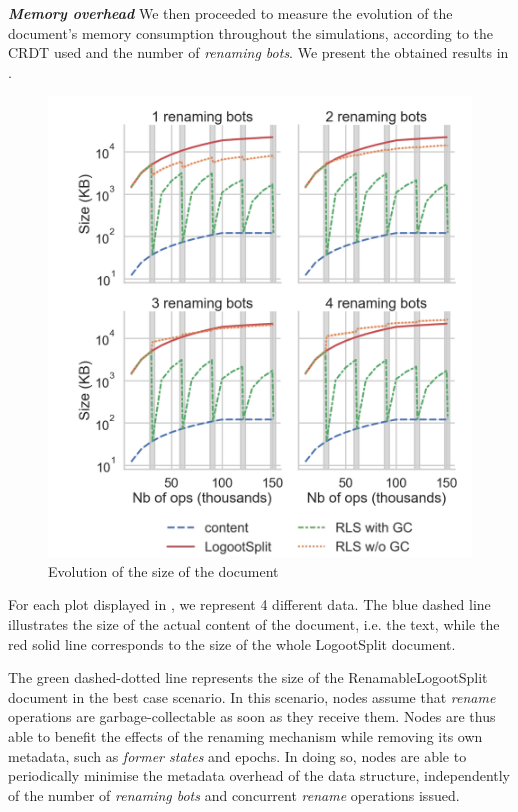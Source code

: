 \documentclass[10pt,journal,compsoc]{IEEEtran}
\let\MYoriglatexcaption\caption
\renewcommand{\caption}[2][\relax]{\MYoriglatexcaption[#2]{#2}}
\newcommand{\ie}{i.e. }
\newcommand{\headerparagraph}[1]{\textbf{\emph{#1}}\quad}
\begin{document}
\headerparagraph{Memory overhead}
%
We then proceeded to measure the evolution of the document's memory consumption throughout the simulations, according to the CRDT used and the number of \emph{renaming bots}.
We present the obtained results in .

\begin{figure}[!ht]
    \centering
    \includegraphics[width=\columnwidth]{img/snapshot-sizes-alt-legende-v2.png}
    \caption{Evolution of the size of the document}
    \label{fig:evolution-document-size}
\end{figure}

For each plot displayed in , we represent 4 different data.
The blue dashed line illustrates the size of the actual content of the document, \ie the text, while the red solid line corresponds to the size of the whole LogootSplit document.

The green dashed-dotted line represents the size of the RenamableLogootSplit document in the best case scenario.
In this scenario, nodes assume that \emph{rename} operations are garbage-collectable as soon as they receive them.
Nodes are thus able to benefit the effects of the renaming mechanism while removing its own metadata, such as \emph{former states} and epochs.
In doing so, nodes are able to periodically minimise the metadata overhead of the data structure, independently of the number of \emph{renaming bots} and concurrent \emph{rename} operations issued.
\end{document}
